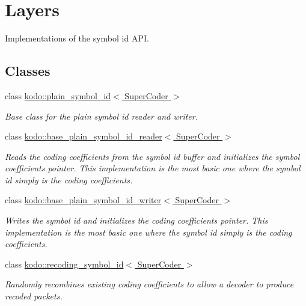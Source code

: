 \hypertarget{group__symbol__id__layers}{\section{Layers}
\label{group__symbol__id__layers}
}


Implementations of the symbol id A\-P\-I.  


\subsection*{Classes}
\begin{DoxyCompactItemize}
\item 
class \hyperlink{classkodo_1_1plain__symbol__id}{kodo\-::plain\-\_\-symbol\-\_\-id$<$ Super\-Coder $>$}
\begin{DoxyCompactList}\small\item\em Base class for the plain symbol id reader and writer. \end{DoxyCompactList}\item 
class \hyperlink{classkodo_1_1base__plain__symbol__id__reader}{kodo\-::base\-\_\-plain\-\_\-symbol\-\_\-id\-\_\-reader$<$ Super\-Coder $>$}
\begin{DoxyCompactList}\small\item\em Reads the coding coefficients from the symbol id buffer and initializes the symbol coefficients pointer. This implementation is the most basic one where the symbol id simply is the coding coefficients. \end{DoxyCompactList}\item 
class \hyperlink{classkodo_1_1base__plain__symbol__id__writer}{kodo\-::base\-\_\-plain\-\_\-symbol\-\_\-id\-\_\-writer$<$ Super\-Coder $>$}
\begin{DoxyCompactList}\small\item\em Writes the symbol id and initializes the coding coefficients pointer. This implementation is the most basic one where the symbol id simply is the coding coefficients. \end{DoxyCompactList}\item 
class \hyperlink{classkodo_1_1recoding__symbol__id}{kodo\-::recoding\-\_\-symbol\-\_\-id$<$ Super\-Coder $>$}
\begin{DoxyCompactList}\small\item\em Randomly recombines existing coding coefficients to allow a decoder to produce recoded packets. \end{DoxyCompactList}\item 

\end{DoxyCompactItemize}
